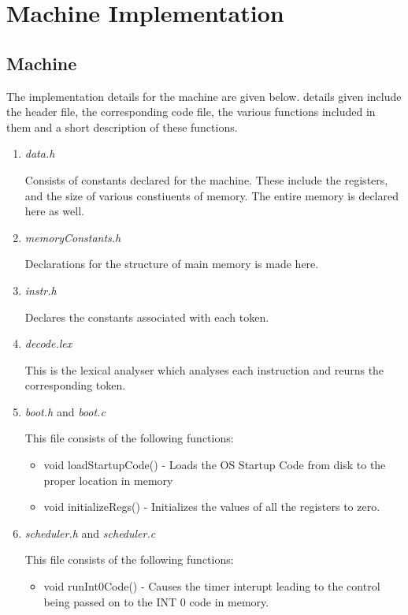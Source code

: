 \chapter{Machine Implementation}
\label{chp:machImplmnt}

\section{Machine}
The implementation details for the machine are given below. details given include the header file, the corresponding code file, the various functions included in them and a short description of these functions.

\begin{enumerate}
	\item \textit{data.h }
	
	Consists of constants declared for the machine. These include the registers, and the size of various constiuents of memory. The entire memory is declared here as well.
	
	\item \textit{memoryConstants.h}
	
	Declarations for the structure of main memory is made here.
	
	\item \textit{instr.h}
	
	Declares the constants associated with each token.
	
	\item \textit{decode.lex}
	
	This is the lexical analyser which analyses each instruction and reurns the corresponding token.
	
	\item \textit{boot.h} and \textit{boot.c}
	
	This file consists of the following functions:
	\begin{itemize}
		\item void loadStartupCode() - Loads the OS Startup Code from disk to the proper location in memory
		\item void initializeRegs() - Initializes the values of all the registers to zero.
	\end{itemize}
	
	\item \textit{scheduler.h} and \textit{scheduler.c}
	
	This file consists of the following functions:
	\begin{itemize}
		\item void runInt0Code() - Causes the timer interupt leading to the control being passed on to the INT 0 code in memory.
	\end{itemize}


\end{enumerate}
